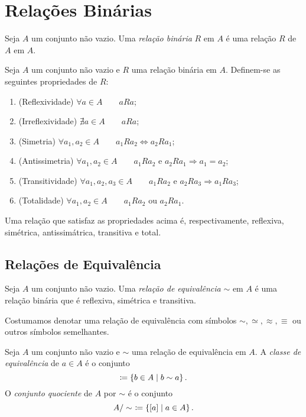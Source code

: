 \chapter{Relações Binárias}
	
\begin{defi}
	Seja $A$ um conjunto não vazio. Uma \emph{relação binária} $R$ em $A$ é uma relação $R$ de $A$ em $A$.
\end{defi}

\begin{defi}
	Seja $A$ um conjunto não vazio e $R$ uma relação binária em $A$. Definem-se as seguintes propriedades de $R$:
	\begin{enumerate}
	\item (Reflexividade) $\forall a \in A \qquad aRa$;
	\item (Irreflexividade) $\nexists a \in A \qquad aRa$;
	\item (Simetria) $\forall a_1,a_2 \in A \qquad a_1Ra_2 \Leftrightarrow a_2Ra_1$;
	\item (Antissimetria) $\forall a_1,a_2 \in A \qquad a_1Ra_2 \text{\ \ e\ \ } a_2Ra_1 \Rightarrow a_1=a_2$;
	\item (Transitividade) $\forall a_1,a_2,a_3 \in A \qquad a_1Ra_2 \text{\ \ e\ \ } a_2Ra_3 \Rightarrow a_1Ra_3$;
	\item (Totalidade) $\forall a_1,a_2 \in A \qquad a_1Ra_2 \text{\ \ ou\ \ } a_2Ra_1$.
	\end{enumerate}
	Uma relação que satisfaz as propriedades acima é, respectivamente, reflexiva, simétrica, antissimátrica, transitiva e total.
\end{defi}



\section{Relações de Equivalência}

\begin{defi}
	Seja $A$ um conjunto não vazio. Uma \emph{relação de equivalência} $\sim$ em $A$ é uma relação binária que é reflexiva, simétrica e transitiva.
\end{defi}

Costumamos denotar uma relação de equivalência com símbolos $\sim, \simeq, \approx, \equiv$ ou outros símbolos semelhantes.

\begin{defi}
	Seja $A$ um conjunto não vazio e $\sim$ uma relação de equivalência em $A$. A \emph{classe de equivalência} de $a \in A$ é o conjunto
	\begin{equation*}
	[a] \coloneqq \set{b \in A}{b \sim a}.
	\end{equation*}
	O \emph{conjunto quociente} de $A$ por $\sim$ é o conjunto
	\begin{equation*}
	A/\sim \ \coloneqq \left\{[a] \;\middle\vert\; a \in A \right\}.
	\end{equation*}
\end{defi}

